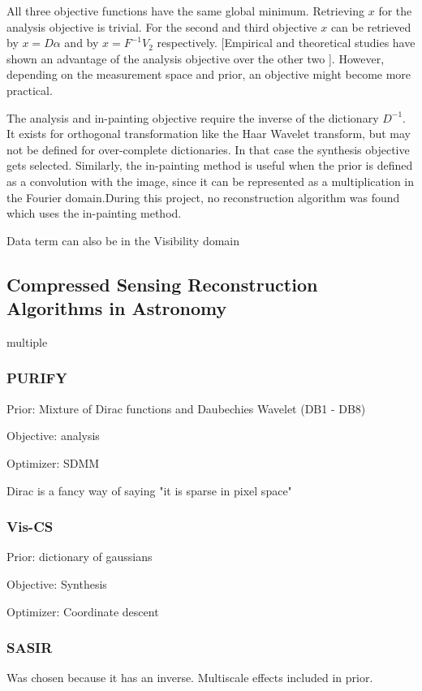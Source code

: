 All three objective functions have the same global minimum. Retrieving $x$ for the analysis objective is trivial. For the second and third objective $x$ can be retrieved by $x = D\alpha$ and by $x = F^{-1}V_2$ respectively. [Empirical and theoretical studies have shown an advantage of the analysis objective over the other two \cite{something}]. However, depending on the measurement space and prior, an objective might become more practical. 

The analysis and in-painting objective require the inverse of the dictionary $D^{-1}$. It exists for orthogonal transformation like the Haar Wavelet transform, but may not be defined for over-complete dictionaries. In that case the synthesis objective gets selected. Similarly, the in-painting method is useful when the prior is defined as a convolution with the image, since it can be represented as a multiplication in the Fourier domain.During this project, no reconstruction algorithm was found which uses the in-painting method.

Data term can also be in the Visibility domain


\subsection{Compressed Sensing Reconstruction Algorithms in Astronomy}
multiple 

\subsubsection{PURIFY}
Prior: Mixture of Dirac functions and Daubechies Wavelet (DB1 - DB8)

Objective: analysis

Optimizer: SDMM

Dirac is a fancy way of saying "it is sparse in pixel space"


\subsubsection{Vis-CS}
Prior: dictionary of gaussians

Objective: Synthesis

Optimizer: Coordinate descent


\subsubsection{SASIR}
Was chosen because it has an inverse. Multiscale effects included in prior.


